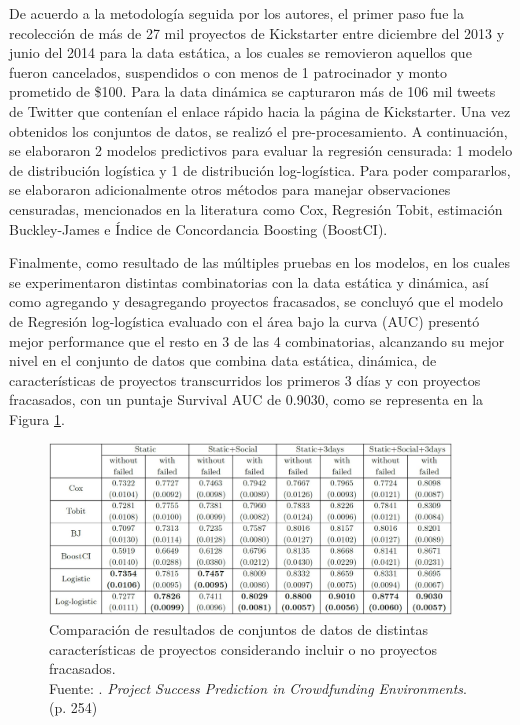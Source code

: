De acuerdo a la metodología seguida por los autores, el primer paso fue la recolección de más de 27 mil proyectos de Kickstarter entre diciembre del 2013 y junio del 2014 para la data estática, a los cuales se removieron aquellos que fueron cancelados, suspendidos o con menos de 1 patrocinador y monto prometido de \$100. Para la data dinámica se capturaron más de 106 mil tweets de Twitter que contenían el enlace rápido hacia la página de Kickstarter. Una vez obtenidos los conjuntos de datos, se realizó el pre-procesamiento. A continuación, se elaboraron 2 modelos predictivos para evaluar la regresión censurada: 1 modelo de distribución logística y 1 de distribución log-logística. Para poder compararlos, se elaboraron adicionalmente otros métodos para manejar observaciones censuradas, mencionados en la literatura como Cox, Regresión Tobit, estimación Buckley-James e Índice de Concordancia Boosting (BoostCI).

Finalmente, como resultado de las múltiples pruebas en los modelos, en los cuales se experimentaron distintas combinatorias con la data estática y dinámica, así como agregando y desagregando proyectos fracasados, se concluyó que el modelo de Regresión log-logística evaluado con el área bajo la curva (AUC) presentó mejor performance que el resto en 3 de las 4 combinatorias, alcanzando su mejor nivel en el conjunto de datos que combina data estática, dinámica, de características de proyectos transcurridos los primeros 3 días y con proyectos fracasados, con un puntaje Survival AUC de 0.9030, como se representa en la Figura \ref{2:fig116}.

\begin{figure}[!ht]
	\begin{center}
		\includegraphics[width=0.95\textwidth]{2/figures/li2016.jpg}
		\caption[Comparación de resultados de conjuntos de datos de distintas características de proyectos considerando incluir o no proyectos fracasados]{Comparación de resultados de conjuntos de datos de distintas características de proyectos considerando incluir o no proyectos fracasados.\\
			Fuente: \cite{pr_li2016predcrowd}. \textit{Project Success Prediction in Crowdfunding Environments}. (p. 254)}
		\label{2:fig116}
	\end{center}
\end{figure}

